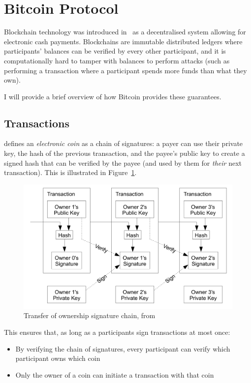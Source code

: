 \section{Bitcoin Protocol}\label{sec:bitcoin}

Blockchain technology was introduced in~\cite{nakamoto2008bitcoin} as a decentralised system allowing for electronic
cash payments.
Blockchains are immutable distributed ledgers where participants' balances can be verified by every other participant,
and it is computationally hard to tamper with balances to perform attacks (such as performing a transaction where a
participant spends more funds than what they own).

I will provide a brief overview of how Bitcoin provides these guarantees.

\subsection{Transactions}\label{subsec:btc:txs}

\cite{nakamoto2008bitcoin} defines an \textit{electronic coin} as a chain of signatures: a payer can use their private
key, the hash of the previous transaction, and the payee's public key to create a signed hash that can be verified by
the payee (and used by them for \textit{their} next transaction).
This is illustrated in Figure~\ref{fig:bitcoin-tx}.

\begin{figure}[th]
    \centering
    \includegraphics[width=0.8\columnwidth]{figures/bitcoin-tx}
    \caption[Bitcoin coin ownership transfer]{Transfer of ownership signature chain, from~\cite{nakamoto2008bitcoin}}
    \label{fig:bitcoin-tx}
\end{figure}

This ensures that, as long as a participants sign transactions at most once:
\begin{itemize}
    \item By verifying the chain of signatures, every participant can verify which participant owns which coin
    \item Only the owner of a coin can initiate a transaction with that coin
\end{itemize}

